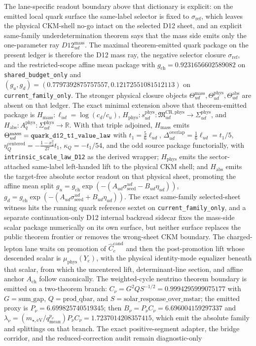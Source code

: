 \begin{itemize}
The lane-specific readout boundary above that dictionary is explicit: on the emitted local quark surface the same-label selector is fixed to \(\sigma_{\mathrm{ref}}\), which leaves the physical CKM-shell no-go intact on the selected D12 sheet, and an explicit same-family underdetermination theorem says that the mass side emits only the one-parameter ray \(D12_{ud}^{\mathrm{mass}}\). The maximal theorem-emitted quark package on the present ledger is therefore the D12 mass ray, the negative selector closure \(\sigma_{\mathrm{ref}}\), and the restricted-scope affine mean package with \(g_{\mathrm{ch}}=0.9231656602589082\) on \texttt{shared\_budget\_only} and \((g_u,g_d)=(0.7797392875757557,0.12172551081512113)\) on \texttt{current\_family\_only}. The stronger physical closure objects \(\Theta_{ud}^{\mathrm{mass}}, \Theta_{ud}^{\mathrm{phys}}, \Theta_{ud}^{\mathrm{abs}}\) are absent on that ledger. The exact minimal extension above that theorem-emitted package is \(H_{\mathrm{mass}}:\ell_{ud}=\log(c_d/c_u)\), \(H_{\mathrm{phys}}:s_{ud}^{\mathrm{phys}}:\mathfrak M_{ud}^{\mathrm{CR,phys}}\to\Sigma_{ud}^{\mathrm{phys}}\), and \(H_{\mathrm{abs}}:A_q^{\mathrm{phys}}:\Sigma_{ud}^{\mathrm{phys}}\to\mathbb R\). With that triple adjoined, \(H_{\mathrm{mass}}\) emits \(\Theta_{ud}^{\mathrm{mass}}=\text{\texttt{quark\_d12\_t1\_value\_law}}\) with \(t_1=\tfrac56\ell_{ud}\), \(\Delta_{ud}^{\mathrm{overlap}}=\tfrac16\ell_{ud}=t_1/5\), \(\eta_Q^{\mathrm{centered}}=-\tfrac{1-x_2^2}{27}t_1\), \(\kappa_Q=-t_1/54\), and the odd source package functorially, with \texttt{intrinsic\_scale\_law\_D12} as the derived wrapper; \(H_{\mathrm{phys}}\) emits the sector-attached same-label left-handed lift to the physical CKM shell; and \(H_{\mathrm{abs}}\) emits the target-free absolute sector readout on that physical sheet, promoting the affine mean split \(g_u=g_{\mathrm{ch}}\exp(-(A_{ud}\sigma_{\mathrm{seed}}^{ud}-B_{ud}\eta_{ud}))\), \(g_d=g_{\mathrm{ch}}\exp(-(A_{ud}\sigma_{\mathrm{seed}}^{ud}+B_{ud}\eta_{ud}))\). The exact same-family selected-sheet witness hits the running quark reference sextet on \texttt{current\_family\_only}, and a separate continuation-only D12 internal backread sidecar fixes the mass-side scalar package numerically on its own surface, but neither surface replaces the public theorem frontier or removes the wrong-sheet CKM boundary. The charged-lepton lane waits on promotion of \(\widehat C_e^{\mathrm{cand}}\) and then the post-promotion lift whose descended scalar is \(\mu_{\mathrm{phys}}(Y_e)\), with the physical identity-mode equalizer beneath that scalar, from which the uncentered lift, determinant-line section, and affine anchor \(A_{\mathrm{ch}}\) follow canonically. The weighted-cycle neutrino theorem boundary is emitted on a two-theorem branch: \(C_\nu=G^2Q S^{-1/2}=0.9994295999075177\) with \(G=\mathrm{sum\_gap}\), \(Q=\mathrm{prod\_qbar}\), and \(S=\mathrm{solar\_response\_over\_mstar}\); the emitted proxy is \(P_\nu=6.699825740519345\); then \(B_\nu=P_\nu C_\nu=6.696004159297337\) and \(\lambda_\nu=(m_{\star,\mathrm{eV}}/q_{\mathrm{mean}}^{p_\nu})P_\nu C_\nu=1.7237014208357415\), which emit the absolute family and splittings on that branch. The exact positive-segment adapter, the bridge corridor, and the reduced-correction audit remain diagnostic-only 
\end{itemize}

